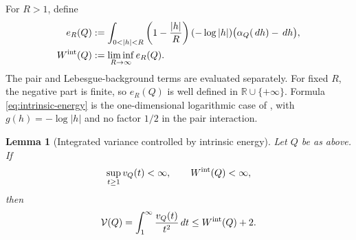 \documentclass[11pt,reqno]{amsart}
\numberwithin{equation}{section}
\newtheorem{lemma}[theorem]{Lemma}
\theoremstyle{definition}
\theoremstyle{remark}
\newcommand{\R}{\mathbb R}
\newcommand{\1}{\mathbf 1}
\newcommand{\dd}{\,d}
\begin{document}
For $R>1$, define
\begin{equation}\label{eq:intrinsic-energy}
\begin{aligned}
e_R(Q)&:=\int_{0<|h|<R}
 \left(1-\frac{|h|}{R}\right)(-\log|h|)
 \bigl(\alpha_Q(\dd h)-\dd h\bigr),\\
W^{\rm int}(Q)&:=\liminf_{R\to\infty}e_R(Q).
\end{aligned}
\end{equation}
The pair and Lebesgue-background terms are evaluated separately.
For fixed $R$, the negative part is finite, so $e_R(Q)$ is well
defined in $\R\cup\{+\infty\}$. Formula
\eqref{eq:intrinsic-energy} is the one-dimensional logarithmic case
of \cite[equation~(3.12)]{Leble}, with $g(h)=-\log|h|$ and no
factor $1/2$ in the pair interaction.

\begin{samepage}
\begin{lemma}[Integrated variance controlled by intrinsic energy]
\label{lem:intrinsic-variance}
Let $Q$ be as above. If
\[
\sup_{t\ge1}v_Q(t)<\infty,
\qquad W^{\rm int}(Q)<\infty,
\]
then
\begin{equation}\label{eq:intrinsic-variance-bound}
\mathcal V(Q)=\int_1^\infty\frac{v_Q(t)}{t^2}\dd t
\le W^{\rm int}(Q)+2.
\end{equation}
\end{lemma}
\end{samepage}
\end{document}
